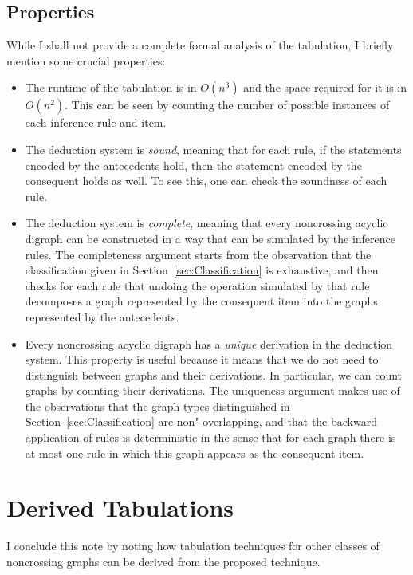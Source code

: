 \documentclass[a4paper]{article}
\begin{document}
\subsection{Properties}

While I shall not provide a complete formal analysis of the
tabulation, I briefly mention some crucial properties:
\begin{itemize}
\item The runtime of the tabulation is in $O(n^3)$ and the space
  required for it is in $O(n^2)$.
  This can be seen by counting the number of possible instances of
  each inference rule and item.
	
\item The deduction system is \emph{sound}, meaning that for each
  rule, if the statements encoded by the antecedents hold, then the
  statement encoded by the consequent holds as well.
  To see this, one can check the soundness of each rule.
  
\item The deduction system is \emph{complete}, meaning that every
  noncrossing acyclic digraph can be constructed in a way that can be
  simulated by the inference rules.
  The completeness argument starts from the observation that the
  classification given in Section~\ref{sec:Classification} is
  exhaustive, and then checks for each rule that undoing the operation
  simulated by that rule decomposes a graph represented by the
  consequent item into the graphs represented by the antecedents.
  
\item Every noncrossing acyclic digraph has a \emph{unique} derivation
  in the deduction system.
  This property is useful because it means that we do not need to
  distinguish between graphs and their derivations.
  In particular, we can count graphs by counting their derivations.
  The uniqueness argument makes use of the observations that the graph
  types distinguished in Section~\ref{sec:Classification} are
  non"-overlapping, and that the backward application of rules is
  deterministic in the sense that for each graph there is at most one
  rule in which this graph appears as the consequent item.
\end{itemize}


\section{Derived Tabulations}

I conclude this note by noting how tabulation techniques for other
classes of noncrossing graphs can be derived from the proposed
technique.
\end{document}
